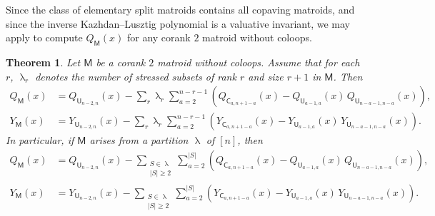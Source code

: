 \documentclass[11pt, a4paper, english]{amsart}
\theoremstyle{teoremas}
\newtheorem{theorem}{Theorem}[section]
\theoremstyle{definition}
\newcommand{\M}{\mathsf{M}}
\newcommand{\U}{\mathsf{U}}
\newcommand{\C}{\mathsf{C}}
\renewcommand{\lambda}{\uplambda}
\begin{document}
Since the class of elementary split matroids contains all copaving matroids, and since the inverse Kazhdan--Lusztig polynomial is a valuative invariant, we may apply \cite[Theorem~1.4]{ferroni-schroter} to compute $Q_{\M}(x)$ for any corank $2$ matroid without coloops.

\begin{theorem}
    Let $\M$ be a corank $2$ matroid without coloops. Assume that for each $r$, $\lambda_r$ denotes the number of stressed subsets of rank $r$ and size $r+1$ in $\M$. Then
    \begin{align*}
        Q_{\M}(x) & = Q_{\U_{n-2,n}}(x) - \sum_{r} \lambda_{r} \sum_{a=2}^{n-r-1} \left(Q_{\C_{a,n+1-a}}(x) - Q_{\U_{a-1,a}}(x)\, Q_{\U_{n-a-1,n-a}}(x)\right), \\
        Y_{\M}(x) & = Y_{\U_{n-2,n}}(x) - \sum_{r} \lambda_{r} \sum_{a=2}^{n-r-1} \left(Y_{\C_{a,n+1-a}}(x) - Y_{\U_{a-1,a}}(x)\, Y_{\U_{n-a-1,n-a}}(x)\right).
    \end{align*}
    In particular, if $\M$ arises from a partition $\lambda$ of $[n]$, then
    \begin{align*}
        Q_{\M}(x) & = Q_{\U_{n-2,n}}(x) - \sum_{\substack{S\in \lambda \\ |S|\geq 2}} \sum_{a=2}^{|S|} \left(Q_{\C_{a,n+1-a}}(x) - Q_{\U_{a-1,a}}(x)\, Q_{\U_{n-a-1,n-a}}(x)\right),\\
        Y_{\M}(x) & = Y_{\U_{n-2,n}}(x) - \sum_{\substack{S\in \lambda \\ |S|\geq 2}}\sum_{a=2}^{|S|} \left(Y_{\C_{a,n+1-a}}(x) - Y_{\U_{a-1,a}}(x)\, Y_{\U_{n-a-1,n-a}}(x)\right).
    \end{align*}
\end{theorem}
\end{document}
